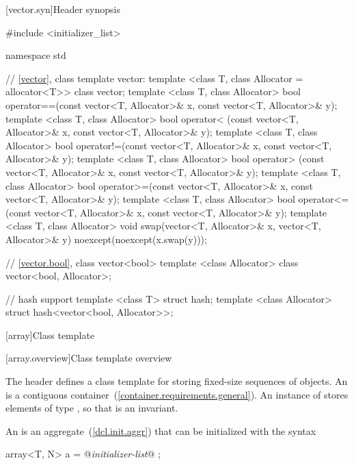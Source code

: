[vector.syn]{Header  synopsis}


\begin{codeblock}
#include <initializer_list>

namespace std {
  // \ref{vector}, class template vector:
  template <class T, class Allocator = allocator<T>> class vector;
  template <class T, class Allocator>
    bool operator==(const vector<T, Allocator>& x, const vector<T, Allocator>& y);
  template <class T, class Allocator>
    bool operator< (const vector<T, Allocator>& x, const vector<T, Allocator>& y);
  template <class T, class Allocator>
    bool operator!=(const vector<T, Allocator>& x, const vector<T, Allocator>& y);
  template <class T, class Allocator>
    bool operator> (const vector<T, Allocator>& x, const vector<T, Allocator>& y);
  template <class T, class Allocator>
    bool operator>=(const vector<T, Allocator>& x, const vector<T, Allocator>& y);
  template <class T, class Allocator>
    bool operator<=(const vector<T, Allocator>& x, const vector<T, Allocator>& y);
  template <class T, class Allocator>
    void swap(vector<T, Allocator>& x, vector<T, Allocator>& y)
      noexcept(noexcept(x.swap(y)));

  // \ref{vector.bool}, class vector<bool>
  template <class Allocator> class vector<bool, Allocator>;

  // hash support
  template <class T> struct hash;
  template <class Allocator> struct hash<vector<bool, Allocator>>;
}
\end{codeblock}

[array]{Class template }
%

[array.overview]{Class template  overview}

\pnum
{}%
The header  defines a class template for storing fixed-size
sequences of objects.
An  is a contiguous container~(\ref{container.requirements.general}).
An instance of  stores  elements of type ,
so that  is an invariant.

\pnum
{}%
%
An  is an aggregate~(\ref{dcl.init.aggr}) that can be
initialized with the syntax
\begin{codeblock}
array<T, N> a = { @\textit{initializer-list}@ };
\end{codeblock}

